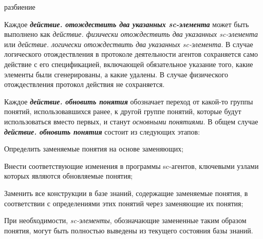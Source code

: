 \begin{SCn}
\begin{scnindent}
\begin{scnindent}
\end{scnindent}
\end{scnindent}

\begin{scnrelfromset}{разбиение}
\end{scnrelfromset}
\end{SCn}

Каждое \textbf{\textit{действие. отождествить два указанных sc-элемента}} может быть выполнено как \textit{действие. физически отождествить два указанных sc-элемента} или \textit{действие. логически отождествить два указанных sc-элемента}. В случае логического отождествления в протоколе деятельности агентов сохраняется само действие с его спецификацией, включающей обязательное указание того, какие элементы были сгенерированы, а какие удалены. В случае физического отождествления протокол действия не сохраняется.

Каждое \textbf{\textit{действие. обновить понятия}} обозначает переход от какой-то группы понятий, использовавшихся ранее, к другой группе понятий, которые будут использоваться вместо первых, и станут \textit{основными понятиями}.
В общем случае \textbf{\textit{действие. обновить понятия}} состоит из следующих этапов:

\begin{textitemize}
	\item Определить заменяемые понятия на основе заменяющих;
	\item Внести соответствующие изменения в программы sc-агентов, ключевыми узлами которых являются обновляемые понятия;
	\item Заменить все конструкции в базе знаний, содержащие заменяемые понятия, в соответствии с определениями этих понятий через заменяющие их понятия;
	\item При необходимости,\textit{ sc-элементы}, обозначающие замененные таким образом понятия, могут быть полностью выведены из текущего состояния базы знаний.
\end{textitemize}

